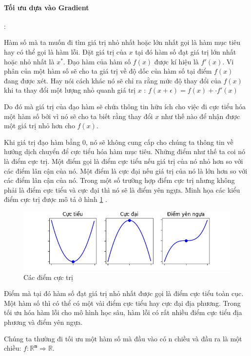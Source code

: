 \documentclass[fontsize=12pt]{scrartcl}
\begin{document}
\paragraph*{Tối ưu dựa vào Gradient}\label{opt:gradient}:
\par
Hàm số mà ta muốn đi tìm giá trị nhỏ nhất hoặc lớn nhất gọi là hàm mục tiêu hay có thể gọi là hàm lỗi. Đặt giá trị của $x$ tại đó hàm số đạt giá trị lớn nhất hoặc nhỏ nhất là $x^*$.
Đạo hàm của hàm số $f(x)$ được kí hiệu là $f'(x)$. Vi phân của một hàm số sẽ cho ta giá trị về độ dốc của hàm số tại điểm $f(x)$ đang được xét. Hay nói cách khác nó sẽ chỉ ra rằng mức độ thay đổi của $f(x)$ khi ta thay đổi một lượng nhỏ quanh giá trị $x$ : $f(x+\epsilon) = f(x) + \cdot f'(x)$
\par
Do đó mà giá trị của đạo hàm sẽ chứa thông tin hữu ích cho việc đi cực tiểu hóa một hàm số bởi vì nó sẽ cho ta biết rằng thay đổi $x$ như thế nào để nhận được một giá trị nhỏ hơn cho $f(x)$. 
\par
Khi giá trị đạo hàm bằng 0, nó sẽ không cung cấp cho chúng ta thông tin về hướng dịch chuyển để cực tiểu hóa hàm mục tiêu. Những điểm như thế ta coi nó là điểm cực trị. Một điểm gọi là điểm cực tiểu nếu giá trị của nó nhỏ hơn so với các điểm lân cận của nó. Một điểm là cực đại nếu giá trị của nó là lớn hơn so với các điểm lân cận của nó. Trong một số trường hợp điểm cực trị nhưng không phải là điểm cực tiểu và cực đại thì nó sẽ là điểm yên ngựa. Minh họa các kiểu điểm cực trị được mô tả ở hình \ref{fig:critical_point} .
\begin{figure}
     \includegraphics[width=\textwidth, scale = 0.1]{img/critical_point}
      \caption{Các điểm cực trị}
       \label{fig:critical_point}
\end{figure}
\par
Điểm mà tại đó hàm số đạt giá trị nhỏ nhất được gọi là điểm cực tiểu toàn cục. Một hàm số thì có thể có một vài điểm cực tiểu hay cực đại địa phương. Trong tối ưu hóa hàm lỗi cho mô hình học sâu, hàm lỗi có rất nhiều điểm cực tiểu địa phương và điểm yên ngựa. 
\par
Chúng ta thường đi tối ưu một hàm số mà đầu vào có n chiều và đầu ra là một chiều: $f: \boldsymbol{\mathbb{R}^n}\Rightarrow \mathbb{R}$.
\end{document}
